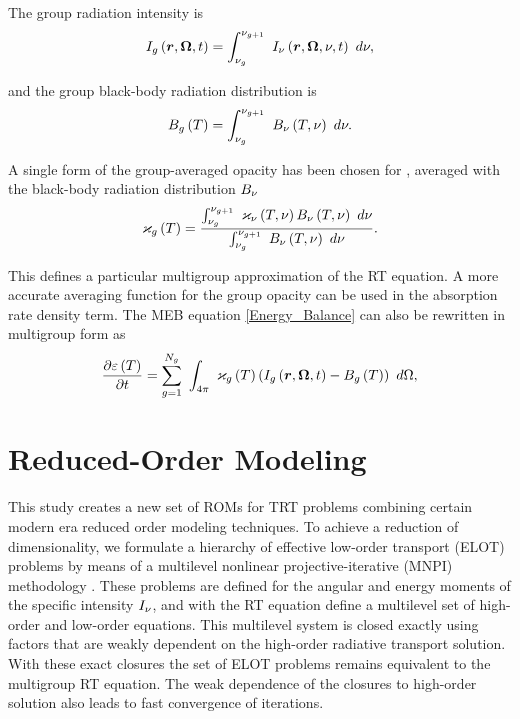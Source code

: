 	The group radiation intensity is
	\begin{equation}
		I_{g}\left(\bm{r},\bm{\Omega},t\right) = \int_{\nu_{g}}^{\nu_{g+1}} \ I_{\nu}\left(\bm{r},\bm{\Omega},\nu,t\right) \ d\nu,
	\end{equation}
	
	and the group black-body radiation distribution is
	\begin{equation}
		B_{g}\left( T\right) = \int_{\nu_{g}}^{\nu_{g+1}} \ B_{\nu}\left( T,\nu\right) \ d\nu.
	\end{equation}
	
	A single form of the group-averaged opacity has been chosen for , averaged with the black-body radiation distribution $B_{\nu}$
	\begin{equation}
		\varkappa_{g}\left( T\right) = \frac{ \int_{\nu_{g}}^{\nu_{g+1}} \ \varkappa_{\nu}\left( T,\nu\right)B_{\nu}\left( T,\nu\right) \ d\nu }{ \int_{\nu_{g}}^{\nu_{g+1}} \ B_{\nu}\left( T,\nu\right) \ d\nu }. \label{kapg}
	\end{equation}
	
	This defines a particular multigroup approximation of the RT equation. A more accurate averaging function for the group opacity can be used in the absorption rate density term. The MEB equation \eqref{Energy_Balance} can also be rewritten in multigroup form as
	\begin{equation}
		\frac{\partial \varepsilon\left( T\right)}{\partial t} = \sum_{g=1}^{N_g} \ \int_{4\pi} \ \varkappa_{g}\left( T\right)\left(I_{g}\left(\bm{r},\bm{\Omega},t\right) - B_{g}\left( T\right)\right) \ d\Omega, \label{multig_meb}
	\end{equation}
	
\section{Reduced-Order Modeling}
	This study creates a new set of ROMs for TRT problems combining certain modern era reduced order modeling techniques. To achieve a reduction of dimensionality, we formulate a hierarchy of effective low-order transport (ELOT) problems by means of a multilevel nonlinear projective-iterative (MNPI) methodology \cite{Goldin-sbornik-82,PASE-1986,dya-aristova-vya-mm1996,aristova-vya-avk-m&c1999}. These problems are defined for the angular and energy moments of the specific intensity $I_{\nu}$, and with the RT equation define a multilevel set of high-order and low-order equations. This multilevel system is closed exactly using factors that are weakly dependent on the high-order radiative transport solution. With these exact closures the set of ELOT problems remains equivalent to the multigroup RT equation. The weak dependence of the closures to high-order solution also leads to fast convergence of iterations.
	
